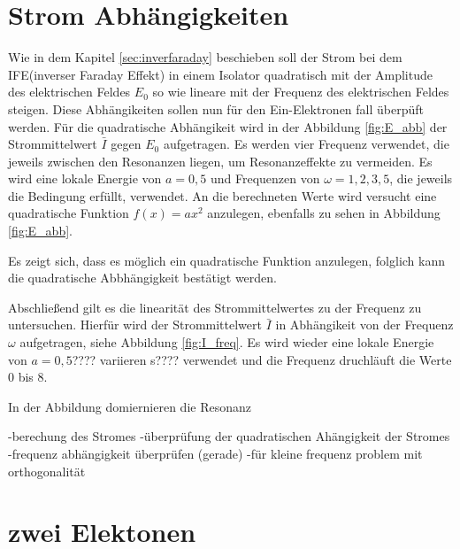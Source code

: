 \section{Strom Abhängigkeiten}
Wie in dem Kapitel \ref{sec:inverfaraday} beschieben
soll der Strom bei dem IFE(inverser Faraday Effekt) in einem Isolator quadratisch mit der Amplitude des elektrischen Feldes $E_0$
so wie lineare mit der Frequenz des elektrischen Feldes \omega steigen. Diese Abhängikeiten sollen nun für den Ein-Elektronen
fall überpüft werden.
Für die quadratische Abhängikeit wird in der Abbildung \ref{fig:E_abb} der Strommittelwert $\bar I$ gegen $E_0$ aufgetragen. Es werden
vier Frequenz verwendet, die jeweils zwischen den Resonanzen liegen, um Resonanzeffekte zu vermeiden.
Es wird eine lokale Energie von $a=0,5$ und Frequenzen von $\omega=1,2,3,5$, die jeweils die Bedingung erfüllt, verwendet.
An die berechneten Werte wird versucht eine quadratische Funktion $f(x)=ax^2$
anzulegen, ebenfalls zu sehen
in Abbildung \ref{fig:E_abb}.


Es zeigt sich, dass es möglich ein quadratische Funktion anzulegen, folglich kann die quadratische Abbhängigkeit
bestätigt werden.

Abschließend gilt es die linearität des Strommittelwertes zu der Frequenz zu untersuchen.
Hierfür wird der Strommittelwert $\bar I$ in Abhängikeit von der Frequenz $\omega$ aufgetragen, siehe Abbildung \ref{fig:I_freq}.
Es wird wieder eine lokale Energie von $a=0,5$???? variieren s???? verwendet und die Frequenz \omega druchläuft die Werte $0$ bis $8$.

In der Abbildung domiernieren die Resonanz


-berechung des Stromes
-überprüfung der quadratischen Ahängigkeit der Stromes
-frequenz abhängigkeit überprüfen (gerade)
-für kleine frequenz problem mit orthogonalität

\section{zwei Elektonen}
